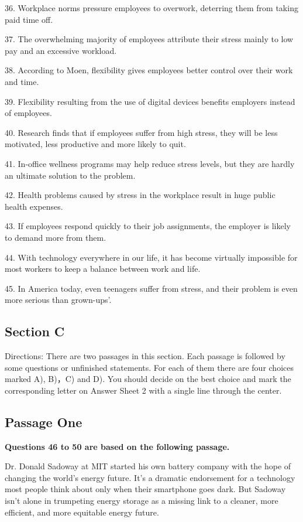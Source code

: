 \documentclass[UTF8,11pt]{ctexart}
\begin{document}
36. Workplace norms pressure employees to overwork, deterring them from taking paid time off.


37. The overwhelming majority of employees attribute their stress mainly to low pay and an excessive workload.


38. According to Moen, flexibility gives employees better control over their work and time.


39. Flexibility resulting from the use of digital devices benefits employers instead of employees.


40. Research finds that if employees suffer from high stress, they will be less motivated, less productive and more likely to quit.


41. In-office wellness programs may help reduce stress levels, but they are hardly an ultimate solution to the problem.


42. Health problems caused by stress in the workplace result in huge public health expenses.


43. If employees respond quickly to their job assignments, the employer is likely to demand more from them.


44. With technology everywhere in our life, it has become virtually impossible for most workers to keep a balance between work and life.


45. In America today, even teenagers suffer from stress, and their problem is even more serious than grown-ups’.


\subsection*{\textbf{Section C}}


Directions: There are two passages in this section. Each passage is followed by some questions or unfinished statements. For each of them there are four choices marked A), B)，C) and D). You should decide on the best choice and mark the corresponding letter on Answer Sheet 2 with a single line through the center.


\subsection*{\textbf{Passage One}}


\textbf{Questions 46 to 50 are based on the following passage.}


Dr. Donald Sadoway at MIT started his own battery company with the hope of changing the world’s energy future. It’s a dramatic endorsement for a technology most people think about only when their smartphone goes dark. But Sadoway isn’t alone in trumpeting energy storage as a missing link to a cleaner, more efficient, and more equitable energy future.
\end{document}
